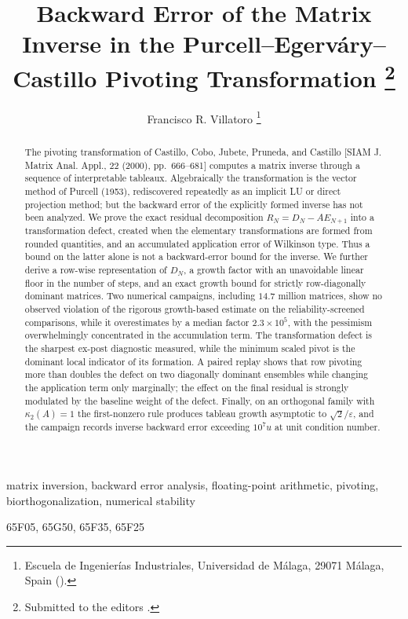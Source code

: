 \documentclass[review,onefignum,onetabnum]{siamart251216}
\title{Backward Error of the Matrix Inverse in the
Purcell--Egerv\'ary--Castillo Pivoting Transformation%
\thanks{Submitted to the editors \submissiondate.}}
\author{Francisco R. Villatoro%
\thanks{Escuela de Ingenier\'ias Industriales, Universidad de M\'alaga,
29071 M\'alaga, Spain
(\email{frvillatoro@uma.es}). \funding{This work was  supported by the Universidad de M\'alaga, Spain,
through project PPRO-B4-2026-004 of its Plan Propio de Investigaci\'on, Transferencia y Divulgaci\'on Cient\'ifica.}}}
\begin{document}
\maketitle

\begin{abstract}
The pivoting transformation of Castillo, Cobo, Jubete, Pruneda, and Castillo
[SIAM J. Matrix Anal. Appl., 22 (2000), pp.~666--681] computes a matrix inverse
through a sequence of interpretable tableaux. Algebraically the transformation is
the vector method of Purcell (1953), rediscovered repeatedly as an implicit LU or
direct projection method; but the backward error of the explicitly formed inverse
has not been analyzed. We prove the exact residual decomposition
$R_N=D_N-AE_{N+1}$ into a transformation defect, created when the elementary
transformations are formed from rounded quantities, and an accumulated application
error of Wilkinson type. Thus a bound on the latter alone is not a backward-error
bound for the inverse. We further derive a row-wise representation of $D_N$, a
growth factor with an unavoidable linear floor in the number of steps, and an exact
growth bound for strictly row-diagonally dominant matrices. Two numerical campaigns,
including $14.7$ million matrices, show no observed violation of the rigorous growth-based estimate on the
reliability-screened comparisons, while it overestimates by a median
factor $2.3\times10^{5}$, with the pessimism overwhelmingly concentrated in the
accumulation term. The transformation defect is the sharpest ex-post diagnostic
measured, while the minimum scaled pivot is the dominant local indicator of its
formation. A paired replay shows that row pivoting more than doubles the defect on
two diagonally dominant ensembles while changing the application term only
marginally; the effect on the final residual is strongly modulated by the baseline
weight of the defect. Finally, on an orthogonal family with $\kappa_2(A)=1$ the
first-nonzero rule produces tableau growth asymptotic to $\sqrt2/\varepsilon$, and
the campaign records inverse backward error exceeding $10^7u$ at unit condition
number.
\end{abstract}

\begin{keywords}
matrix inversion, backward error analysis, floating-point arithmetic,
pivoting, biorthogonalization, numerical stability
\end{keywords}

\begin{MSCcodes}
65F05, 65G50, 65F35, 65F25
\end{MSCcodes}
\end{document}
